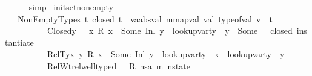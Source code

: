 \begin{isabellebody}
\ \ \ \ \isamarkupfalse%
\ simp\isanewline
{}\isamarkupfalse%
%
\endisatagproof
{\isafoldproof}%
%
\isadelimproof
\isanewline
%
\endisadelimproof
\isanewline
{}\isamarkupfalse%
\ init{\isacharunderscore}{\kern0pt}set{\isacharunderscore}{\kern0pt}non{\isacharunderscore}{\kern0pt}empty{\isacharcolon}{\kern0pt}\isanewline
\ \ \ NonEmptyTypes{\isacharcolon}{\kern0pt}{\isachardoublequoteopen}{\isasymAnd}\ t{\isachardot}{\kern0pt}\ closed\ t\ {\isasymLongrightarrow}\ {\isasymexists}v{\isacharcolon}{\kern0pt}{\isacharcolon}{\kern0pt}{\isacharparenleft}{\kern0pt}{\isacharprime}{\kern0pt}a{\isacharcolon}{\kern0pt}{\isacharcolon}{\kern0pt}absval{\isacharcomma}{\kern0pt}\ {\isacharprime}{\kern0pt}m{\isacharcolon}{\kern0pt}{\isacharcolon}{\kern0pt}mapval{\isacharparenright}{\kern0pt}\ val{\isachardot}{\kern0pt}\ type{\isacharunderscore}{\kern0pt}of{\isacharunderscore}{\kern0pt}val\ v\ {\isacharequal}{\kern0pt}\ t{\isachardoublequoteclose}\ \isanewline
\ \ \ \ \ \ \ \ \ \ Closed{\isacharcolon}{\kern0pt}{\isachardoublequoteopen}{\isasymAnd}y\ {\isasymtau}{\isachardot}{\kern0pt}\ {\isasymnot}{\isacharparenleft}{\kern0pt}{\isasymexists}\ x{\isachardot}{\kern0pt}\ R\ x\ {\isacharequal}{\kern0pt}\ Some\ {\isacharparenleft}{\kern0pt}Inl\ y{\isacharparenright}{\kern0pt}{\isacharparenright}{\kern0pt}\ {\isasymLongrightarrow}\ lookup{\isacharunderscore}{\kern0pt}var{\isacharunderscore}{\kern0pt}ty\ {\isasymLambda}{\isacharprime}{\kern0pt}\ y\ {\isacharequal}{\kern0pt}\ Some\ {\isasymtau}\ {\isasymLongrightarrow}\ closed\ {\isacharparenleft}{\kern0pt}instantiate\ {\isasymOmega}\ {\isasymtau}{\isacharparenright}{\kern0pt}{\isachardoublequoteclose}\ \ \ \ \ \ \ \ \ \ \ \isanewline
\ \ \ \ \ \ \ \ \ \ RelTy{\isacharcolon}{\kern0pt}{\isachardoublequoteopen}{\isasymAnd}x\ y{\isachardot}{\kern0pt}\ R\ x\ {\isacharequal}{\kern0pt}\ Some\ {\isacharparenleft}{\kern0pt}Inl\ y{\isacharparenright}{\kern0pt}\ {\isasymLongrightarrow}\ lookup{\isacharunderscore}{\kern0pt}var{\isacharunderscore}{\kern0pt}ty\ {\isasymLambda}\ x\ {\isacharequal}{\kern0pt}\ lookup{\isacharunderscore}{\kern0pt}var{\isacharunderscore}{\kern0pt}ty\ {\isasymLambda}{\isacharprime}{\kern0pt}\ y{\isachardoublequoteclose}\ \isanewline
\ \ \ \ \ \ \ \ \ \ RelWt{\isacharcolon}{\kern0pt}{\isachardoublequoteopen}rel{\isacharunderscore}{\kern0pt}well{\isacharunderscore}{\kern0pt}typed\ {\isasymLambda}\ {\isasymOmega}\ R\ {\isacharparenleft}{\kern0pt}ns{\isacharcolon}{\kern0pt}{\isacharcolon}{\kern0pt}{\isacharparenleft}{\kern0pt}{\isacharprime}{\kern0pt}a{\isacharcomma}{\kern0pt}\ {\isacharprime}{\kern0pt}m{\isacharparenright}{\kern0pt}\ nstate{\isacharparenright}{\kern0pt}{\isachardoublequoteclose}\ \isanewline

\end{isabellebody}
